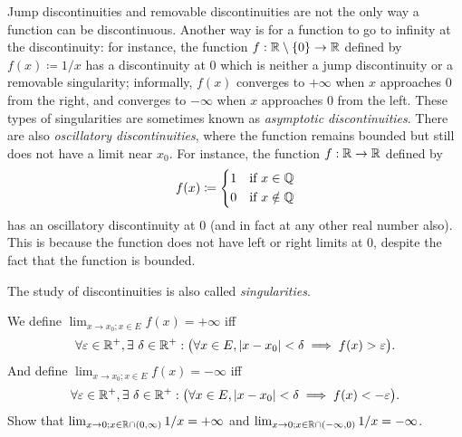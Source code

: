 \begin{rmk}\label{9.5.4}
  Jump discontinuities and removable discontinuities are not the only way a function can be discontinuous.
  Another way is for a function to go to infinity at the discontinuity:
  for instance, the function \(f : \mathbb{R} \setminus \{0\} \to \mathbb{R}\) defined by \(f(x) \coloneqq 1 / x\) has a discontinuity at \(0\) which is neither a jump discontinuity or a removable singularity;
  informally, \(f(x)\) converges to \(+\infty\) when \(x\) approaches \(0\) from the right, and converges to \(-\infty\) when \(x\) approaches \(0\) from the left.
  These types of singularities are sometimes known as \emph{asymptotic discontinuities}.
  There are also \emph{oscillatory discontinuities}, where the function remains bounded but still does not have a limit near \(x_0\).
  For instance, the function \(f : \mathbb{R} \to \mathbb{R}\) defined by
  \[
    f(x) \coloneqq \begin{dcases}
      1 & \text{if } x \in \mathbb{Q}    \\
      0 & \text{if } x \notin \mathbb{Q}
    \end{dcases}
  \]
  has an oscillatory discontinuity at \(0\) (and in fact at any other real number also).
  This is because the function does not have left or right limits at \(0\), despite the fact that the function is bounded.
\end{rmk}

\begin{note}
  The study of discontinuities is also called \emph{singularities}.
\end{note}

\begin{ac}\label{ac:9.5.2}
  We define \(\lim_{x \to x_0 ; x \in E} f(x) = +\infty\) iff
  \[
    \forall \varepsilon \in \R^+, \exists\ \delta \in \R^+ : \big(\forall x \in E, \abs{x - x_0} < \delta \implies f(x) > \varepsilon\big).
  \]
  And define \(\lim_{x \to x_0 ; x \in E} f(x) = -\infty\) iff
  \[
    \forall \varepsilon \in \R^+, \exists\ \delta \in \R^+ : \big(\forall x \in E, \abs{x - x_0} < \delta \implies f(x) < -\varepsilon\big).
  \]
  Show that \(\lim_{x \to 0 ; x \in \mathbb{R} \cap (0, \infty)} 1 / x = +\infty\) and \(\lim_{x \to 0 ; x \in \mathbb{R} \cap (-\infty, 0)} 1 / x = -\infty\).
\end{ac}

